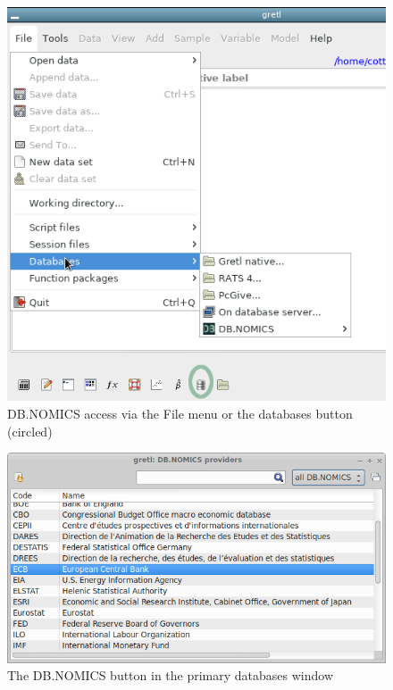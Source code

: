 \documentclass{article}
\begin{document}
\begin{figure}[htbp]
  \centering
  \includegraphics[scale=2.0]{db-access-1}
  \caption{DB.NOMICS access via the File menu or the databases
    button (circled)}
  \label{fig:db-access-1}
\end{figure}

\begin{figure}[htbp]
  \centering
  \includegraphics[scale=0.5]{db-access-2}
  \caption{The DB.NOMICS button in the primary databases window}
  \label{fig:db-access-2}
\end{figure}
\end{document}
